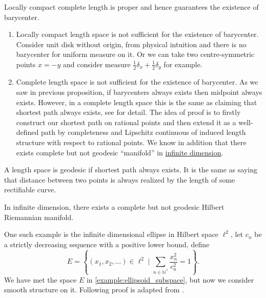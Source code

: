 \begin{example}
	Locally compact complete length is proper and hence guarantees the existence of barycenter.
	\begin{enumerate}
		\item Locally compact length space is not sufficient for the existence of barycenter.
		      Consider unit disk without origin,
		      from physical intuition and there is no barycenter for uniform measure on it.
		      Or we can take two centre-symmetric points $x = - y$ and
		      consider measure $\frac{1}{2}\delta_x + \frac{1}{2}\delta_y$ for example.
		\item Complete length space is not sufficient for the existence of barycenter.
		      As we saw in previous proposition, if barycenters always exists then midpoint always exists.
		      However, in a complete length space this is the same as claiming that shortest path always exists,
		      see \cite[Theorem 2.4.16]{burago2001course} for detail.
		      The idea of proof is to firstly construct our shortest path on rational points and then extend it
		      as a well-defined path by completeness and Lipschitz continuous of induced length structure with respect to rational points.
		      We know in addition that there exists complete but not geodesic ``manifold'' in \underline{infinite dimension}.
	\end{enumerate}
\end{example}

A length space is geodesic if shortest path always exists.
It is the same as saying that distance between two points is always realized by the length of some rectifiable curve.

\begin{lem}
	In infinite dimension, there exists a complete but not geodesic Hilbert Riemannian manifold.
\end{lem}

One such example is the infinite dimensional ellipse in Hilbert space $\ell^2$, let $c_n$ be a strictly decreasing sequence with a positive lower bound, define
\[
	E = \left\{ \left( x _ { 1 } , x _ { 2 } , \ldots \right) \in \ell^2 \mid \sum _ { n \in \mathbb { N }^* } \frac { x _ { n } ^ { 2 } } { c _ { n } ^ { 2 } } = 1 \right\}.
\]
We have met the space $E$ in \cref{example:ellipsoid_subspace},
but now we consider smooth structure on it.
Following proof is adapted from \cite[Example 5.1]{grossman1965hilbert}.

